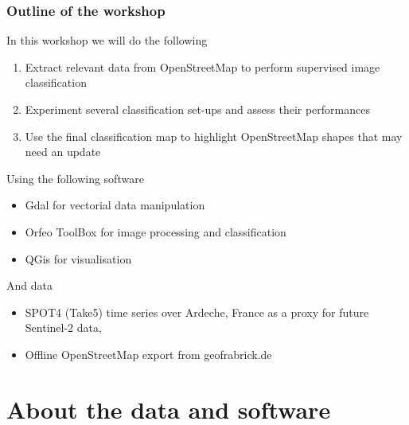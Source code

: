 \documentclass[8pt]{beamer}
\begin{document}
\begin{frame}
\frametitle{Outline of the workshop}
\begin{block}{In this workshop we will do the following}
\begin{enumerate}
\item Extract relevant data from OpenStreetMap to perform supervised image classification
\item Experiment several classification set-ups and assess their performances
\item Use the final classification map to highlight OpenStreetMap shapes that may need an update
\end{enumerate}
\end{block}
\begin{block}{Using the following software}
\begin{itemize}
\item Gdal for vectorial data manipulation
\item Orfeo ToolBox for image processing and classification
\item QGis for visualisation
\end{itemize}
\end{block}
\begin{block}{And data}
\begin{itemize}
\item SPOT4 (Take5) time series over Ardeche, France as a proxy for future Sentinel-2 data,
\item Offline OpenStreetMap export from geofrabrick.de
\end{itemize}
\end{block}

\end{frame}
\section{About the data and software}
\end{document}
